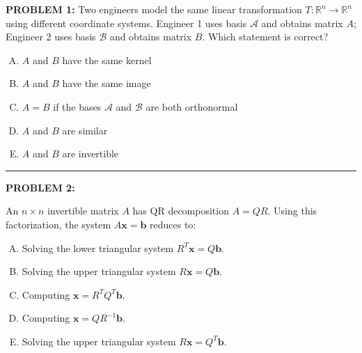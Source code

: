 \documentclass[12pt]{amsart}
\newcommand{\divider}{
  \vspace{-1em} %
  \noindent
  \raisebox{-0.15ex}{\textbullet}%
  \hspace{0.5em}%
  \rule[0.5ex]{0.95\textwidth}{1.0pt}%
  \hspace{0.5em}%
  \raisebox{-0.15ex}{\textbullet}%
  \vspace{0em} %
}
\begin{document}
{\bf PROBLEM 1:}
%
Two engineers model the same linear transformation $T:\mathbb{R}^n\to\mathbb{R}^n$ using different coordinate systems. Engineer 1 uses basis $\mathcal{A}$ and obtains matrix $A$; Engineer 2 uses basis $\mathcal{B}$ and obtains matrix $B$. Which statement is correct?

\begin{enumerate}[(A)]
\item $A$ and $B$ have the same kernel
\item $A$ and $B$ have the same image
\item $A=B$ if the bases $\mathcal{A}$ and $\mathcal{B}$ are both orthonormal
\item $A$ and $B$ are similar
\item $A$ and $B$ are invertible
\end{enumerate}

%
\divider
%

{\bf PROBLEM 2:}

An $n \times n$ invertible matrix $A$ has QR decomposition $A = QR$. Using this factorization, the system $A\mathbf{x} = \mathbf{b}$ reduces to:

\begin{enumerate}[(A)]
\item Solving the lower triangular system $R^T\mathbf{x} = Q\mathbf{b}$.
\item Solving the upper triangular system $R\mathbf{x} = Q\mathbf{b}$.
\item Computing $\mathbf{x} = R^TQ^T\mathbf{b}$.
\item Computing $\mathbf{x} = QR^{-1}\mathbf{b}$.
\item Solving the upper triangular system $R\mathbf{x} = Q^T\mathbf{b}$.
\end{enumerate}
\end{document}
